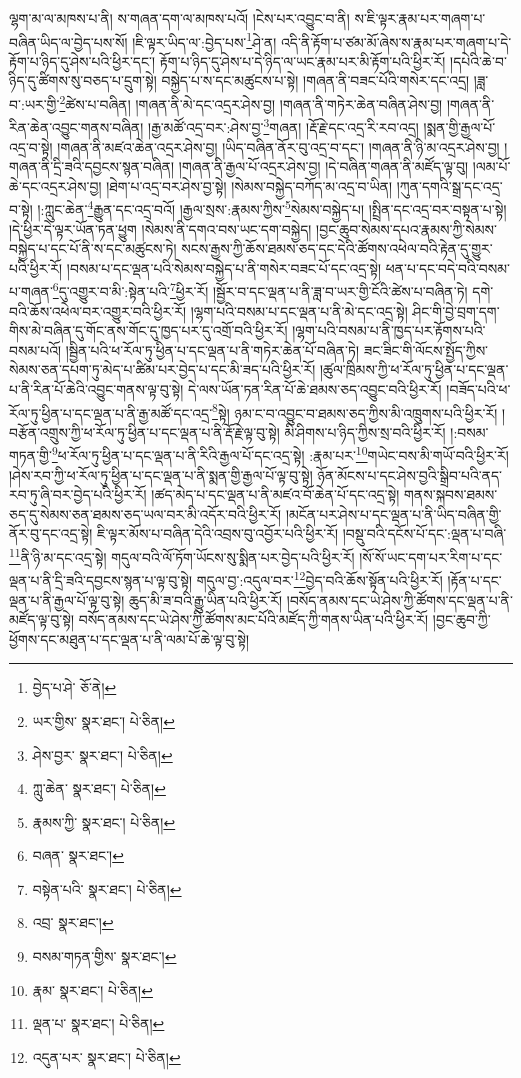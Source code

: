 ལྷག་མ་ལ་མཁས་པ་ནི། ས་གཞན་དག་ལ་མཁས་པའོ། །ངེས་པར་འབྱུང་བ་ནི། ས་ཇི་ལྟར་རྣམ་པར་གཞག་པ་བཞིན་ཡིད་ལ་བྱེད་པས་སོ། །ཇི་ལྟར་ཡིད་ལ་:བྱེད་པས་\footnote{བྱེད་པ་ཤེ་  ཅོ་ནེ། }ཤེ་ན། འདི་ནི་རྟོག་པ་ཙམ་མོ་ཞེས་ས་རྣམ་པར་གཞག་པ་དེ་རྟོག་པ་ཉིད་དུ་ཤེས་པའི་ཕྱིར་དང་། རྟོག་པ་ཉིད་དུ་ཤེས་པ་དེ་ཉིད་ལ་ཡང་རྣམ་པར་མི་རྟོག་པའི་ཕྱིར་རོ། །དཔེའི་ཆེ་བ་ཉིད་དུ་ཚིགས་སུ་བཅད་པ་དྲུག་སྟེ། བསྐྱེད་པ་ས་དང་མཚུངས་པ་སྟེ། །གཞན་ནི་བཟང་པོའི་གསེར་དང་འདྲ། །ཟླ་བ་:ཡར་གྱི་\footnote{ཡར་གྱིས་  སྣར་ཐང་།  པེ་ཅིན། }ཚེས་པ་བཞིན། །གཞན་ནི་མེ་དང་འདྲར་ཤེས་བྱ། །གཞན་ནི་གཏེར་ཆེན་བཞིན་ཤེས་བྱ། །གཞན་ནི་རིན་ཆེན་འབྱུང་གནས་བཞིན། །རྒྱ་མཚོ་འདྲ་བར་:ཤེས་བྱ་\footnote{ཤེས་བྱར་  སྣར་ཐང་།  པེ་ཅིན། }གཞན། །རྡོ་རྗེ་དང་འདྲ་རི་རབ་འདྲ། །སྨན་གྱི་རྒྱལ་པོ་འདྲ་བ་སྟེ། །གཞན་ནི་མཛའ་ཆེན་འདྲར་ཤེས་བྱ། །ཡིད་བཞིན་ནོར་བུ་འདྲ་བ་དང་། །གཞན་ནི་ཉི་མ་འདྲར་ཤེས་བྱ། །གཞན་ནི་དྲི་ཟའི་དབྱངས་སྙན་བཞིན། །གཞན་ནི་རྒྱལ་པོ་འདྲར་ཤེས་བྱ། །དེ་བཞིན་གཞན་ནི་མཛོད་ལྟ་བུ། །ལམ་པོ་ཆེ་དང་འདྲར་ཤེས་བྱ། །ཐེག་པ་འདྲ་བར་ཤེས་བྱ་སྟེ། །སེམས་བསྐྱེད་བཀོད་མ་འདྲ་བ་ཡིན། །ཀུན་དགའི་སྒྲ་དང་འདྲ་བ་སྟེ། །:ཀླུང་ཆེན་\footnote{ཀླུ་ཆེན་  སྣར་ཐང་།  པེ་ཅིན། }རྒྱུན་དང་འདྲ་བའོ། །རྒྱལ་སྲས་:རྣམས་ཀྱིས་\footnote{རྣམས་ཀྱི་  སྣར་ཐང་།  པེ་ཅིན། }སེམས་བསྐྱེད་པ། །སྤྲིན་དང་འདྲ་བར་བསྟན་པ་སྟེ། །དེ་ཕྱིར་དེ་ལྟར་ཡོན་ཏན་ཕྱུག །སེམས་ནི་དགའ་བས་ཡང་དག་བསྐྱེད། །བྱང་ཆུབ་སེམས་དཔའ་རྣམས་ཀྱི་སེམས་བསྐྱེད་པ་དང་པོ་ནི་ས་དང་མཚུངས་ཏེ། སངས་རྒྱས་ཀྱི་ཆོས་ཐམས་ཅད་དང་དེའི་ཚོགས་འཕེལ་བའི་རྟེན་དུ་གྱུར་པའི་ཕྱིར་རོ། །བསམ་པ་དང་ལྡན་པའི་སེམས་བསྐྱེད་པ་ནི་གསེར་བཟང་པོ་དང་འདྲ་སྟེ། ཕན་པ་དང་བདེ་བའི་བསམ་པ་གཞན་\footnote{བཞན་  སྣར་ཐང་། }དུ་འགྱུར་བ་མི་:སྟེན་པའི་\footnote{བསྟེན་པའི་  སྣར་ཐང་།  པེ་ཅིན། }ཕྱིར་རོ། །སྦྱོར་བ་དང་ལྡན་པ་ནི་ཟླ་བ་ཡར་གྱི་ངོའི་ཚེས་པ་བཞིན་ཏེ། དགེ་བའི་ཆོས་འཕེལ་བར་འགྱུར་བའི་ཕྱིར་རོ། །ལྷག་པའི་བསམ་པ་དང་ལྡན་པ་ནི་མེ་དང་འདྲ་སྟེ། ཤིང་གི་བྱེ་བྲག་དག་གིས་མེ་བཞིན་དུ་གོང་ནས་གོང་དུ་ཁྱད་པར་དུ་འགྲོ་བའི་ཕྱིར་རོ། །ལྷག་པའི་བསམ་པ་ནི་ཁྱད་པར་རྟོགས་པའི་བསམ་པའོ། །སྦྱིན་པའི་ཕ་རོལ་ཏུ་ཕྱིན་པ་དང་ལྡན་པ་ནི་གཏེར་ཆེན་པོ་བཞིན་ཏེ། ཟང་ཟིང་གི་ལོངས་སྤྱོད་ཀྱིས་སེམས་ཅན་དཔག་ཏུ་མེད་པ་ཚིམ་པར་བྱེད་པ་དང་མི་ཟད་པའི་ཕྱིར་རོ། །ཚུལ་ཁྲིམས་ཀྱི་ཕ་རོལ་ཏུ་ཕྱིན་པ་དང་ལྡན་པ་ནི་རིན་པོ་ཆེའི་འབྱུང་གནས་ལྟ་བུ་སྟེ། དེ་ལས་ཡོན་ཏན་རིན་པོ་ཆེ་ཐམས་ཅད་འབྱུང་བའི་ཕྱིར་རོ། །བཟོད་པའི་ཕ་རོལ་ཏུ་ཕྱིན་པ་དང་ལྡན་པ་ནི་རྒྱ་མཚོ་དང་འདྲ་\footnote{འབྲ་  སྣར་ཐང་། }སྟེ། ཉམ་ང་བ་འབྱུང་བ་ཐམས་ཅད་ཀྱིས་མི་འཁྲུགས་པའི་ཕྱིར་རོ། །བརྩོན་འགྲུས་ཀྱི་ཕ་རོལ་ཏུ་ཕྱིན་པ་དང་ལྡན་པ་ནི་རྡོ་རྗེ་ལྟ་བུ་སྟེ། མི་ཤིགས་པ་ཉིད་ཀྱིས་སྲ་བའི་ཕྱིར་རོ། །:བསམ་གཏན་གྱི་\footnote{བསམ་གཏན་གྱིས་  སྣར་ཐང་། }ཕ་རོལ་ཏུ་ཕྱིན་པ་དང་ལྡན་པ་ནི་རིའི་རྒྱལ་པོ་དང་འདྲ་སྟེ། :རྣམ་པར་\footnote{རྣམ་  སྣར་ཐང་།  པེ་ཅིན། }གཡེང་བས་མི་གཡོ་བའི་ཕྱིར་རོ། །ཤེས་རབ་ཀྱི་ཕ་རོལ་ཏུ་ཕྱིན་པ་དང་ལྡན་པ་ནི་སྨན་གྱི་རྒྱལ་པོ་ལྟ་བུ་སྟེ། ཉོན་མོངས་པ་དང་ཤེས་བྱའི་སྒྲིབ་པའི་ནད་རབ་ཏུ་ཞི་བར་བྱེད་པའི་ཕྱིར་རོ། །ཚད་མེད་པ་དང་ལྡན་པ་ནི་མཛའ་བོ་ཆེན་པོ་དང་འདྲ་སྟེ། གནས་སྐབས་ཐམས་ཅད་དུ་སེམས་ཅན་ཐམས་ཅད་ཡལ་བར་མི་འདོར་བའི་ཕྱིར་རོ། །མངོན་པར་ཤེས་པ་དང་ལྡན་པ་ནི་ཡིད་བཞིན་གྱི་ནོར་བུ་དང་འདྲ་སྟེ། ཇི་ལྟར་མོས་པ་བཞིན་དེའི་འབྲས་བུ་འབྱོར་པའི་ཕྱིར་རོ། །བསྡུ་བའི་དངོས་པོ་དང་:ལྡན་པ་བཞི་\footnote{ལྡན་པ་  སྣར་ཐང་།  པེ་ཅིན། }ནི་ཉི་མ་དང་འདྲ་སྟེ། གདུལ་བའི་ལོ་ཏོག་ཡོངས་སུ་སྨིན་པར་བྱེད་པའི་ཕྱིར་རོ། །སོ་སོ་ཡང་དག་པར་རིག་པ་དང་ལྡན་པ་ནི་དྲི་ཟའི་དབྱངས་སྙན་པ་ལྟ་བུ་སྟེ། གདུལ་བྱ་:འདུལ་བར་\footnote{འདུན་པར་  སྣར་ཐང་།  པེ་ཅིན། }བྱེད་བའི་ཆོས་སྟོན་པའི་ཕྱིར་རོ། །རྟོན་པ་དང་ལྡན་པ་ནི་རྒྱལ་པོ་ལྟ་བུ་སྟེ། ཆུད་མི་ཟ་བའི་རྒྱུ་ཡིན་པའི་ཕྱིར་རོ། །བསོད་ནམས་དང་ཡེ་ཤེས་ཀྱི་ཚོགས་དང་ལྡན་པ་ནི་མཛོད་ལྟ་བུ་སྟེ། བསོད་ནམས་དང་ཡེ་ཤེས་ཀྱི་ཚོགས་མང་པོའི་མཛོད་ཀྱི་གནས་ཡིན་པའི་ཕྱིར་རོ། །བྱང་ཆུབ་ཀྱི་ཕྱོགས་དང་མཐུན་པ་དང་ལྡན་པ་ནི་ལམ་པོ་ཆེ་ལྟ་བུ་སྟེ། 